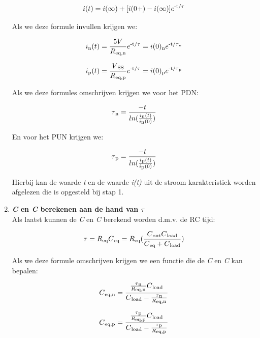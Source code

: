 \documentclass{article}
\begin{document}
\begin{enumerate}
\begin{equation}
i(t) = i(\infty) + [i(0+) - i(\infty)]e\textsuperscript{-t/$\tau$}
\end{equation}

Als we deze formule invullen krijgen we:

\begin{equation}
i\textsubscript{n}(t) = \frac{5V}{R\textsubscript{eq,n}}e\textsuperscript{-t/$\tau$} = i(0)\textsubscript{n}e\textsuperscript{-t/$\tau$\textsubscript{n}}
\end{equation}

\begin{equation}
i\textsubscript{p}(t) = \frac{V\textsubscript{SS}}{R\textsubscript{eq,p}}e\textsuperscript{-t/$\tau$} = i(0)\textsubscript{p}e\textsuperscript{-t/$\tau$\textsubscript{p}}
\end{equation}

Als we deze formules omschrijven krijgen we voor het PDN:

\begin{equation}
\tau\textsubscript{n} = \frac{-t}{ln(\frac{i\textsubscript{n}(t)}{i\textsubscript{n}(0)})}
\end{equation}

En voor het PUN krijgen we:

\begin{equation}
\tau\textsubscript{p} = \frac{-t}{ln(\frac{i\textsubscript{p}(t)}{i\textsubscript{p}(0)})}
\end{equation}

Hierbij kan de waarde \emph{t} en de waarde \emph{i(t)} uit de stroom karakteristiek worden afgelezen die is opgesteld bij stap 1.

\item \textbf{\emph{C} en \emph{C} berekenen aan de hand van $\tau$}\\
Als laatst kunnen de \emph{C} en \emph{C} berekend worden d.m.v. de RC tijd:

\begin{equation}
\tau = R\textsubscript{eq}C\textsubscript{eq} = R\textsubscript{eq}(\frac{C\textsubscript{out}C\textsubscript{load}}{C\textsubscript{eq} + C\textsubscript{load}})
\end{equation}

Als we deze formule omschrijven krijgen we een functie die de \emph{C} en \emph{C} kan bepalen:

\begin{equation}
C\textsubscript{eq,n} = \frac{\frac{\tau\textsubscript{n}}{R\textsubscript{eq,n}}C\textsubscript{load}}{C\textsubscript{load} - \frac{\tau\textsubscript{n}}{R\textsubscript{eq,n}}}
\end{equation}

\begin{equation}
C\textsubscript{eq,p} = \frac{\frac{\tau\textsubscript{p}}{R\textsubscript{eq,p}}C\textsubscript{load}}{C\textsubscript{load} - \frac{\tau\textsubscript{p}}{R\textsubscript{eq,p}}}
\end{equation}


\end{enumerate}
\end{document}
